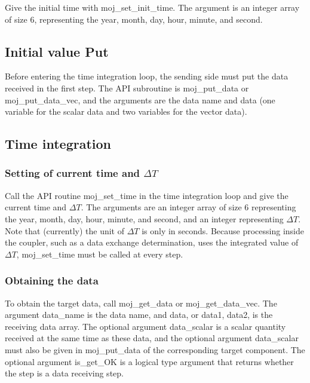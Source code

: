 Give the initial time with moj\_set\_init\_time. The argument is an
integer array of size 6, representing the year, month, day, hour,
minute, and second.

\hypertarget{initial-value-put}{%
\subsection{Initial value Put}\label{initial-value-put}}

Before entering the time integration loop, the sending side must put the
data received in the first step. The API subroutine is moj\_put\_data or
moj\_put\_data\_vec, and the arguments are the data name and data (one
variable for the scalar data and two variables for the vector data).

\hypertarget{time-integration}{%
\subsection{Time integration}\label{time-integration}}

\hypertarget{setting-of-current-time-and-deltat}{%
\subsubsection{\texorpdfstring{Setting of current time and
\(\Delta{T}\)}{Setting of current time and \textbackslash Delta\{T\}}}\label{setting-of-current-time-and-deltat}}

Call the API routine moj\_set\_time in the time integration loop and
give the current time and \(\Delta{T}\). The arguments are an integer
array of size 6 representing the year, month, day, hour, minute, and
second, and an integer representing \(\Delta{T}\). Note that (currently)
the unit of \(\Delta{T}\) is only in seconds. Because processing inside
the coupler, such as a data exchange determination, uses the integrated
value of \(\Delta{T}\), moj\_set\_time must be called at every step.

\hypertarget{obtaining-the-data}{%
\subsubsection{Obtaining the data}\label{obtaining-the-data}}

To obtain the target data, call moj\_get\_data or moj\_get\_data\_vec.
The argument data\_name is the data name, and data, or data1, data2, is
the receiving data array. The optional argument data\_scalar is a scalar
quantity received at the same time as these data, and the optional
argument data\_scalar must also be given in moj\_put\_data of the
corresponding target component. The optional argument is\_get\_OK is a
logical type argument that returns whether the step is a data receiving
step.

